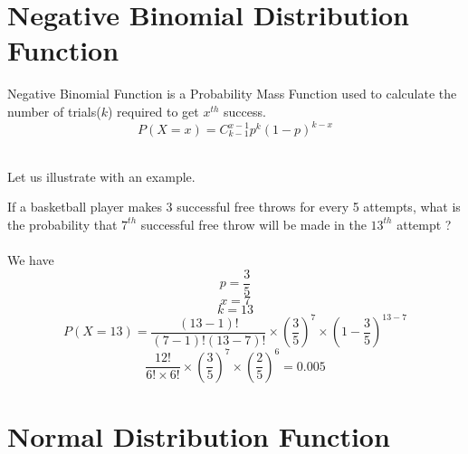 \documentclass[twoside,12pt]{report}  %
\begin{document}
\section{Negative Binomial Distribution Function}

\begin{tcolorbox}[colback=red!5!white, colframe=red!75!black, title = \textbf{Negative Binomial Distribution}]
	Negative Binomial Function is a Probability Mass Function used to calculate the number of trials($k$) required to get $x^{th}$ success.
	$$ \boxed{P(X=x) = C^{x-1}_{k-1}p^{k} (1-p)^{k-x}} $$
\end{tcolorbox}
\noindent
\\
Let us illustrate with an example.
\\\begin{tcolorbox}[colback=blue!5!white, colframe=blue!75!black, title = \textbf{Negative Binomial Distribution}]
	If a basketball player makes 3 successful free throws for every 5 attempts, what is the probability that $7^{th}$ successful free throw will be made in the $13^{th}$ attempt ?
	\\
	\\
	We have
	$$ p = \frac{3}{5} $$
	$$ x = 7 $$
	$$ k = 13 $$
	$$ P(X = 13) = \frac{(13-1)!}{(7-1)!(13-7)!} \times \left(\frac{3}{5}\right)^{7} \times \left( 1-\frac{3}{5} \right) ^ {13-7} $$
	$$ \frac{12!}{6! \times 6!} \times \left(\frac{3}{5}\right)^{7} \times \left( \frac{2}{5} \right) ^ 6 = 0.005 $$
\end{tcolorbox}

\section{Normal Distribution Function}
\end{document}
